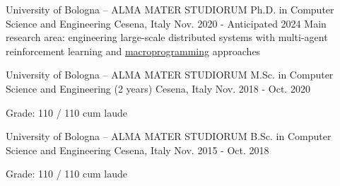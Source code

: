 
\begin{cventries}

\cventry
{University of Bologna -- ALMA MATER STUDIORUM} %
{Ph.D. in Computer Science and Engineering} %
{Cesena, Italy} %
{Nov. 2020 - Anticipated 2024} %
{Main research area: engineering large-scale distributed systems with multi-agent reinforcement learning and \href{https://dl.acm.org/doi/10.1145/3579353}{\url{macroprogramming}} approaches} %

\cventry
{University of  Bologna -- ALMA MATER STUDIORUM} %
{M.Sc. in Computer Science and Engineering (2 years) } %
{Cesena, Italy} %
{Nov. 2018 - Oct. 2020} %
{
  \begin{cvitems} %
    \item {Grade: 110 / 110 cum laude}
  \end{cvitems}
}

\cventry
{University of  Bologna -- ALMA MATER STUDIORUM} %
{B.Sc. in Computer Science and Engineering} %
{Cesena, Italy} %
{Nov. 2015 - Oct. 2018} %
{
  \begin{cvitems} %
    \item {Grade: 110 / 110 cum laude}
  \end{cvitems}
}

\end{cventries}
